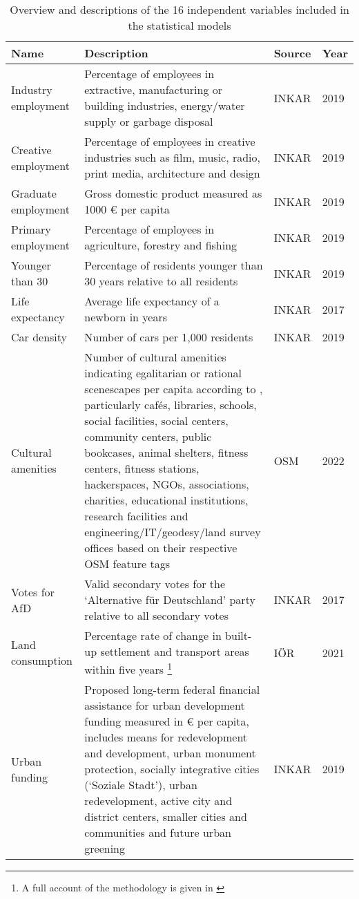 \begin{table}
\begin{minipage}{\textwidth}

\caption{\label{tab:indep}Overview and descriptions of the 16 independent variables included in the statistical models}
\centering
\footnotesize
\begin{tabularx}{\textwidth}{lXll}
\toprule
Name & Description & Source & Year\\
\midrule
Industry employment & Percentage of employees in extractive, manufacturing or building industries, energy/water supply or garbage disposal & INKAR & 2019\\
Creative employment & Percentage of employees in creative industries such as film, music, radio, print media, architecture and design & INKAR & 2019\\
Graduate employment & Gross domestic product measured as 1000 € per capita & INKAR & 2019\\
Primary employment & Percentage of employees in agriculture, forestry and fishing & INKAR & 2019\\
Younger than 30 & Percentage of residents younger than 30 years relative to all residents & INKAR & 2019\\
\addlinespace
Life expectancy & Average life expectancy of a newborn in years & INKAR & 2017\\
Car density & Number of cars per 1,000 residents & INKAR & 2019\\
Cultural amenities & Number of cultural amenities indicating egalitarian or rational scenescapes per capita according to \textcite[100f]{Silver2016}, particularly cafés, libraries, schools, social facilities, social centers, community centers, public bookcases, animal shelters, fitness centers, fitness stations, hackerspaces, NGOs, associations, charities, educational institutions, research facilities and engineering/IT/geodesy/land survey offices based on their respective OSM feature tags & OSM & 2022\\
Votes for AfD & Valid secondary votes for the `Alternative für Deutschland' party relative to all secondary votes & INKAR & 2017\\
Land consumption & Percentage rate of change in built-up settlement and transport areas within five years \footnote{A full account of the methodology is given in \textcite{Schorcht2016}} & IÖR & 2021\\
\addlinespace
Urban funding & Proposed long-term federal financial assistance for urban development funding measured in € per capita, includes means for redevelopment and development, urban monument protection, socially integrative cities (`Soziale Stadt'), urban redevelopment, active city and district centers, smaller cities and communities and future urban greening & INKAR & 2019\\

\end{tabularx}
\end{minipage}
\end{table}

